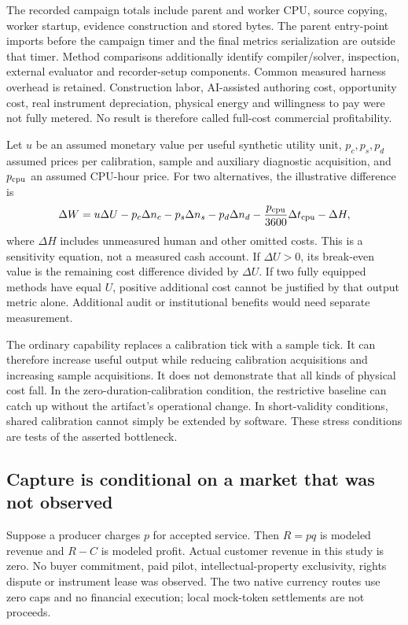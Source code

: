 The recorded campaign totals include parent and worker CPU, source copying, worker startup, evidence construction and stored bytes. The parent entry-point imports before the campaign timer and the final metrics serialization are outside that timer. Method comparisons additionally identify compiler/solver, inspection, external evaluator and recorder-setup components. Common measured harness overhead is retained. Construction labor, AI-assisted authoring cost, opportunity cost, real instrument depreciation, physical energy and willingness to pay were not fully metered. No result is therefore called full-cost commercial profitability.

\CostTable

\AdditionalCosts

Let $u$ be an assumed monetary value per useful synthetic utility unit, $p_c,p_s,p_d$ assumed prices per calibration, sample and auxiliary diagnostic acquisition, and $p_{\rm cpu}$ an assumed CPU-hour price. For two alternatives, the illustrative difference is
\begin{equation}
\Delta W=u\Delta U-p_c\Delta n_c-p_s\Delta n_s-p_d\Delta n_d
-\frac{p_{\rm cpu}}{3600}\Delta t_{\rm cpu}-\Delta H,
\end{equation}
where $\Delta H$ includes unmeasured human and other omitted costs. This is a sensitivity equation, not a measured cash account. If $\Delta U>0$, its break-even value is the remaining cost difference divided by $\Delta U$. If two fully equipped methods have equal $U$, positive additional cost cannot be justified by that output metric alone. Additional audit or institutional benefits would need separate measurement.

The ordinary capability replaces a calibration tick with a sample tick. It can therefore increase useful output while reducing calibration acquisitions and increasing sample acquisitions. It does not demonstrate that all kinds of physical cost fall. In the zero-duration-calibration condition, the restrictive baseline can catch up without the artifact's operational change. In short-validity conditions, shared calibration cannot simply be extended by software. These stress conditions are tests of the asserted bottleneck.

\SensitivityResults

\subsection{Capture is conditional on a market that was not observed}
Suppose a producer charges $p$ for accepted service. Then $R=pq$ is modeled revenue and $R-C$ is modeled profit. Actual customer revenue in this study is zero. No buyer commitment, paid pilot, intellectual-property exclusivity, rights dispute or instrument lease was observed. The two native currency routes use zero caps and no financial execution; local mock-token settlements are not proceeds.

